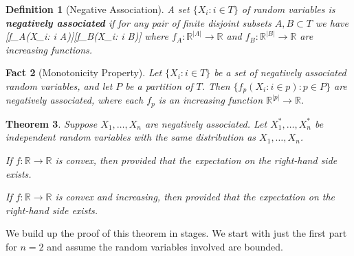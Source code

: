 \documentclass{article}
\newtheorem{theorem}{Theorem}
\newtheorem{fact}[theorem]{Fact}
\newtheorem{definition}[theorem]{Definition}
\newcommand*{\defn}[1]{\textbf{#1}}
\newcommand*{\R}[0]{\mathbb{R}}
\newcommand*{\E}[0]{\mathbf{E}}
\def\[#1\]{\begin{align*}#1\end{align*}}
\begin{document}

\begin{definition}[Negative Association]
  A set $\{X_i : i \in T\}$ of random variables is \defn{negatively associated} if for any pair of finite disjoint subsets $A, B \subset T$
  we have
  \[\E[f_A(X_i: i \in A)f_B(X_i: i \in B)] \le \E[f_A(X_i: i \in A)]\E[f_B(X_i: i \in B)]\]
  where $f_A : \R^{|A|} \to \R$ and $f_B : \R^{|B|} \to \R$ are increasing functions.
\end{definition}

\begin{fact}[Monotonicity Property]
  Let $\{X_i : i \in T\}$ be a set of negatively associated random variables,
  and let $P$ be a partition of $T$.
  Then $\{f_p(X_i : i \in p) : p \in P\}$ are negatively associated,
  where each $f_p$ is an increasing function $\R^{|p|} \to \R$.
\end{fact}

\begin{theorem}
  \label{thm:na-convex}
  Suppose $X_1, \dots, X_n$ are negatively associated.
  Let $X_1^*, \dots, X_n^*$ be independent random variables with the same distribution as $X_1, \dots, X_n$.
  \begin{thmenum}
  \item \label{thm:na-convex-sum} If $f : \R \to \R$ is convex, then
    \[\E{} \le \E{}\]
    provided that the expectation on the right-hand side exists.

  \item \label{thm:na-convex-maxsum}
    If $f : \R \to \R$ is convex and increasing, then
    \[\E\left[f\left(\max_{1 \le k \le n} \sum_{i=1}^k X_i\right)\right] \le \E\left[f\left(\max_{1 \le k \le n} \sum_{i=1}^k X_i^*\right)\right]\]
    provided that the expectation on the right-hand side exists.
  \end{thmenum}
\end{theorem}

We build up the proof of this theorem in stages.  We start with just the first part for $n = 2$ and assume the random variables involved are bounded.
\end{document}
